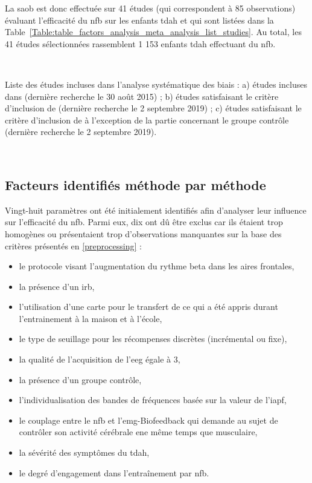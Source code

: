 La \gls{saob} est donc effectuée sur 41 études (qui correspondent à 85 observations) évaluant l'efficacité du \gls{nfb} sur les enfants \gls{tdah} et 
qui sont listées dans la Table~\ref{Table:table_factors_analysis_meta_analysis_list_studies}. Au total, les 41 études sélectionnées rassemblent 
1 153 enfants \gls{tdah} effectuant du \gls{nfb}.

\newpage\
\begin{table}[h!]
  \centering
  \caption{Liste des études incluses dans l'analyse systématique des biais : a) études incluses dans \citet{Cortese2016}
	(dernière recherche le 30 août 2015) ; b) études satisfaisant le critère d'inclusion de \citet{Cortese2016} (dernière recherche le 2 septembre 2019) ; c) études 
	satisfaisant le critère d'inclusion de \citet{Cortese2016} à l'exception de la partie concernant le groupe contrôle (dernière recherche le 2 septembre 2019).}
  
  \label{Table:table_factors_analysis_meta_analysis_list_studies}
\end{table}

\newpage\
\subsection{Facteurs identifiés méthode par méthode}

Vingt-huit paramètres ont été initialement identifiés afin d'analyser leur influence sur l'efficacité du \gls{nfb}. Parmi eux, dix ont dû être exclus car ils étaient trop
homogènes ou présentaient trop d'observations manquantes sur la base des critères présentés en \ref{preprocessing} : 
\begin{itemize}
	\item le protocole visant l'augmentation du rythme beta dans les aires frontales,
	\item la présence d'un \gls{irb},
  \item l'utilisation d'une carte pour le transfert de ce qui a été appris durant l'entrainement à la maison et à l'école, 
  \item le type de seuillage pour les récompenses discrètes (incrémental ou fixe),
  \item la qualité de l'acquisition de l'\gls{eeg} égale à 3,
	\item la présence d'un groupe contrôle,
	\item l'individualisation des bandes de fréquences basée sur la valeur de l'\gls{iapf},
	\item le couplage entre le \gls{nfb} et l'\gls{emg}-Biofeedback qui demande au sujet de contrôler son activité cérébrale ene même temps que musculaire,
	\item la sévérité des symptômes du \gls{tdah},
	\item le degré d'engagement dans l'entraînement par \gls{nfb}.
\end{itemize} 

